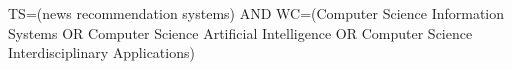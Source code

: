 TS=(news recommendation systems) 
AND 
WC=(Computer Science Information Systems OR 
    Computer Science Artificial Intelligence OR 
    Computer Science Interdisciplinary Applications)